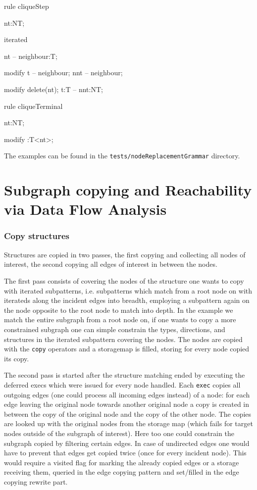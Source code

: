   \begin{example}
    \begin{grgen}
rule cliqueStep
{
  nt:NT;
  
  iterated {
    nt -- neighbour:T;

    modify {
      t -- neighbour;
      nnt -- neighbour;
    }
  }
  
  modify {
    delete(nt);
    t:T -- nnt:NT;
  }
}

rule cliqueTerminal
{
  nt:NT;
  
  modify {
    :T<nt>;
  }
}
    \end{grgen}
  \end{example}

The examples can be found in the \texttt{tests/nodeReplacementGrammar} directory.

\section{Subgraph copying and Reachability via Data Flow Analysis}\label{sub:copyflow}

\subsubsection*{Copy structures}\label{subsub:copystructure}
Structures are copied in two passes, the first copying and collecting all nodes of interest, the second copying all edges of interest in between the nodes.

The first pass consists of covering the nodes of the structure one wants to copy with iterated subpatterns,
i.e. subpatterns which match from a root node on with iterateds along the incident edges into breadth,
employing a subpattern again on the node opposite to the root node to match into depth.
In the example we match the entire subgraph from a root node on, if one wants to copy a more constrained subgraph one can simple constrain the types, directions, and structures in the iterated subpattern covering the nodes.
The nodes are copied with the \texttt{copy} operators and a storagemap is filled, storing for every node copied its copy.

The second pass is started after the structure matching ended by executing the deferred execs which were issued for every node handled. 
Each \texttt{exec} copies all outgoing edges (one could process all incoming edges instead) of a node:
for each edge leaving the original node towards another original node a copy is created in between the copy of the original node and the copy of the other node.
The copies are looked up with the original nodes from the storage map (which fails for target nodes outside of the subgraph of interest).
Here too one could constrain the subgraph copied by filtering certain edges.
In case of undirected edges one would have to prevent that edges get copied twice (once for every incident node). This would require a visited flag for marking the already copied edges or a storage receiving them, queried in the edge copying pattern and set/filled in the edge copying rewrite part.

